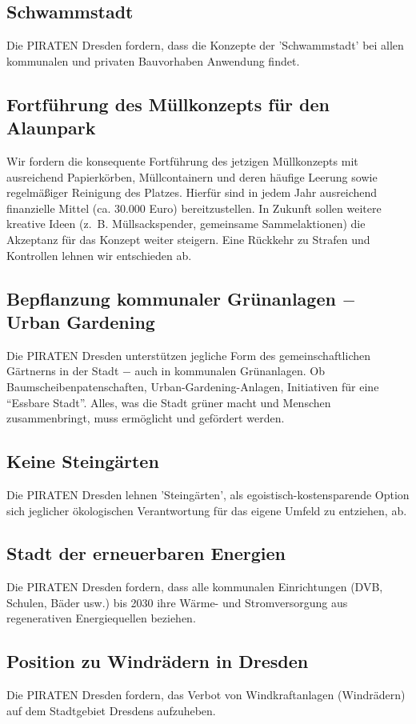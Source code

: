 \documentclass[a4paper, 11pt]{article}
\begin{document}
\subsection{Schwammstadt}
Die PIRATEN Dresden fordern, dass die Konzepte der 'Schwammstadt' bei allen kommunalen und privaten Bauvorhaben Anwendung findet.

\subsection{Fortführung des Müllkonzepts für den Alaunpark}
Wir fordern die konsequente Fortführung des jetzigen Müllkonzepts mit ausreichend Papierkörben, Müllcontainern und deren häufige Leerung sowie regelmäßiger Reinigung des Platzes. Hierfür sind in jedem Jahr ausreichend finanzielle Mittel (ca. 30.000 Euro) bereitzustellen. In Zukunft sollen weitere kreative Ideen (z. B. Müllsackspender, gemeinsame Sammelaktionen) die Akzeptanz für das Konzept weiter steigern. Eine Rückkehr zu Strafen und Kontrollen lehnen wir entschieden ab.


\subsection{Bepflanzung kommunaler Grünanlagen $-$ Urban Gardening}
Die PIRATEN Dresden unterstützen jegliche Form des gemeinschaftlichen Gärtnerns in der Stadt $-$ auch in kommunalen Grünanlagen. Ob Baumscheibenpatenschaften, Urban-Gardening-Anlagen, Initiativen für eine ``Essbare Stadt''. Alles, was die Stadt grüner macht und Menschen zusammenbringt, muss ermöglicht und gefördert werden.


\subsection{Keine Steingärten}
Die PIRATEN Dresden lehnen 'Steingärten', als egoistisch-kostensparende Option sich jeglicher ökologischen Verantwortung für das eigene Umfeld zu entziehen, ab.


\subsection{Stadt der erneuerbaren Energien}
Die PIRATEN Dresden fordern, dass alle kommunalen Einrichtungen (DVB, Schulen, Bäder usw.) bis 2030 ihre Wärme- und Stromversorgung aus regenerativen Energiequellen beziehen.


\subsection{Position zu Windrädern in Dresden}
Die PIRATEN Dresden fordern, das Verbot von Windkraftanlagen (Windrädern) auf dem Stadtgebiet Dresdens aufzuheben.
\end{document}
